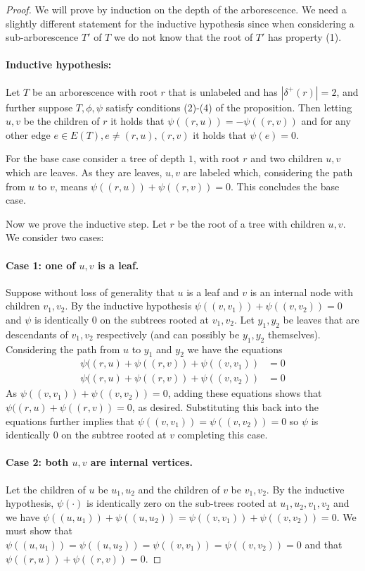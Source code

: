 \documentclass[10pt,a4paper]{article}
\newcommand{\1}{\mathbf{1}}
\theoremstyle{definition}
\begin{document}
\begin{proof}
We will prove by induction on the depth of the arborescence.  We need a slightly different statement for the inductive hypothesis
since when considering a sub-arborescence $T'$ of $T$ we do not know that the root of $T'$ has property (1).

\paragraph{Inductive hypothesis:} Let $T$ be an arborescence with root $r$ that is unlabeled and has $|\delta^+(r)| = 2$, and further suppose
$T, \phi, \psi$ satisfy conditions (2)-(4) of the proposition.  Then letting $u,v$ be the children of $r$ it holds that
$\psi((r,u)) = -\psi((r,v))$ and for any other edge $e \in E(T), e \ne (r,u),(r,v)$ it holds that $\psi(e) = 0$.

For the base case consider a tree of depth $1$, with root $r$ and two children $u,v$ which are leaves.  As they are leaves, $u,v$ are
labeled which, considering the path from $u$ to $v$, means $\psi((r,u)) + \psi((r,v)) = 0$.  This concludes the base case.

Now we prove the inductive step.  Let $r$ be the root of a tree with children $u,v$.  We consider two cases:
\paragraph{Case 1: one of $u,v$ is a leaf.} Suppose without loss of generality that $u$ is a leaf and $v$ is an internal node with children $v_1, v_2$.
By the inductive hypothesis $\psi((v,v_1)) + \psi((v,v_2)) = 0$ and $\psi$ is identically $0$ on the subtrees rooted at $v_1,v_2$.  Let $y_1, y_2$ be leaves
that are descendants of $v_1,v_2$ respectively (and can possibly be $y_1,y_2$ themselves).  Considering the path from $u$ to $y_1$ and $y_2$ we have
the equations
\begin{align*}
\psi((r,u) + \psi((r,v)) + \psi((v,v_1)) &= 0 \\
\psi((r,u) + \psi((r,v)) + \psi((v,v_2)) &= 0
\end{align*}
As $\psi((v,v_1)) + \psi((v,v_2)) = 0$, adding these equations shows that $\psi((r,u) + \psi((r,v)) =0$, as desired.  Substituting this back
into the equations further implies that $\psi((v,v_1)) = \psi((v,v_2)) = 0$ so $\psi$ is identically $0$ on the subtree rooted at $v$ completing
this case.

\paragraph{Case 2: both $u,v$ are internal vertices.} Let the children of $u$ be $u_1, u_2$ and the
children of $v$ be $v_1, v_2$.
By the inductive hypothesis, $\psi(\cdot)$ is identically zero on the sub-trees rooted at $u_1, u_2, v_1, v_2$
and we have $\psi((u,u_1)) + \psi((u,u_2)) = \psi((v,v_1)) + \psi((v,v_2))= 0$.  We must show that $\psi((u,u_1))= \psi((u,u_2))=\psi((v,v_1)) =\psi((v,v_2))= 0$
and that $\psi((r,u)) + \psi((r,v)) = 0$.


\end{proof}
\end{document}
